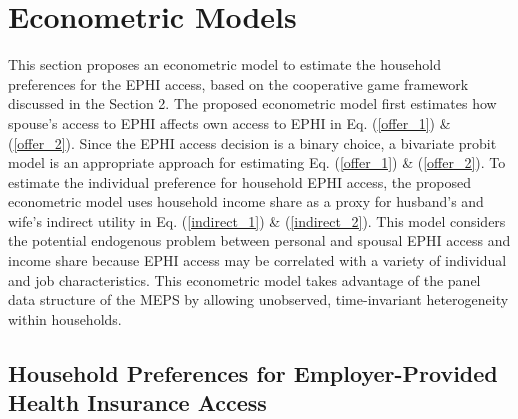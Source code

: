 \documentclass[legno,11pt]{article}
\begin{document}
\section{Econometric Models}\label{section4}
This section proposes an econometric model to estimate the household
preferences for the EPHI access, based on the cooperative game
framework discussed in the Section 2. The proposed econometric model
first estimates how spouse's access to EPHI affects own access to
EPHI in Eq. (\ref{offer_1}) \& (\ref{offer_2}).  Since the EPHI
access decision is a binary choice, a bivariate probit model is an
appropriate approach for estimating Eq. (\ref{offer_1}) \&
(\ref{offer_2}). To estimate the individual preference for household
EPHI access, the proposed econometric model uses household income
share as a proxy for husband's and wife's indirect utility in Eq.
(\ref{indirect_1}) \& (\ref{indirect_2}). This model considers the
potential endogenous problem between personal and spousal EPHI
access and income share because EPHI access may be correlated with a
variety of individual and job characteristics. This econometric
model takes advantage of the panel data structure of the MEPS by
allowing unobserved, time-invariant heterogeneity within households.

\subsection{Household Preferences for Employer-Provided Health Insurance Access}\label{section4_1}
\end{document}
